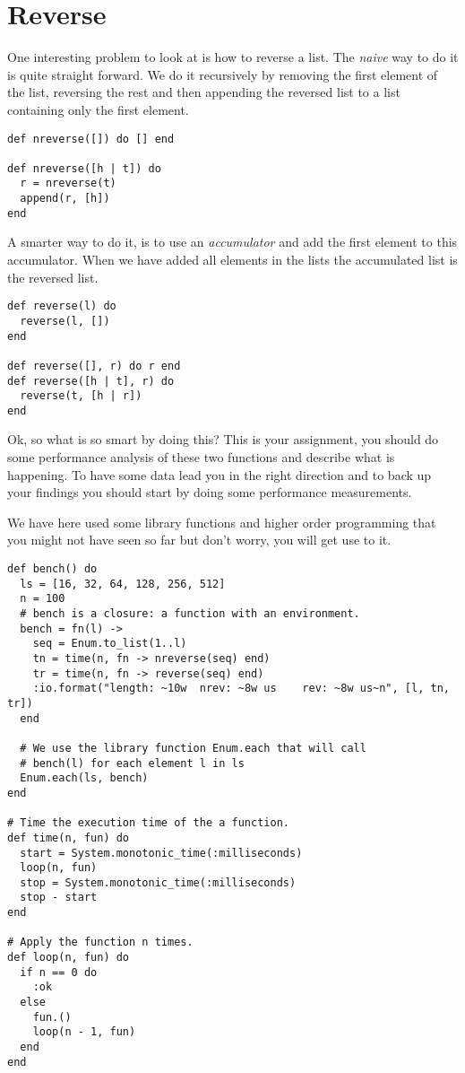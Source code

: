 \documentclass[a4paper,11pt]{article}
\begin{document}
\section{Reverse}

One interesting problem to look at is how to reverse a list. The {\em
  naive} way to do it is quite straight forward. We do it recursively
by removing the first element of the list, reversing the rest and then
appending the reversed list to a list containing only the first element.

\begin{verbatim}
def nreverse([]) do [] end

def nreverse([h | t]) do
  r = nreverse(t)
  append(r, [h])
end
\end{verbatim}

A smarter way to do it, is to use an {\em accumulator} and add the
first element to this accumulator. When we have added all elements in
the lists the accumulated list is the reversed list.

\begin{verbatim}
def reverse(l) do
  reverse(l, [])
end

def reverse([], r) do r end
def reverse([h | t], r) do
  reverse(t, [h | r])
end
\end{verbatim}

Ok, so what is so smart by doing this? This is your assignment, you
should do some performance analysis of these two functions and
describe what is happening. To have some data lead you in the right
direction and to back up your findings you should start by doing some
performance measurements.

We have here used some library functions and higher order programming
that you might not have seen so far but don't worry, you will get use
to it.

\begin{verbatim}
def bench() do
  ls = [16, 32, 64, 128, 256, 512]
  n = 100
  # bench is a closure: a function with an environment.
  bench = fn(l) ->
    seq = Enum.to_list(1..l)
    tn = time(n, fn -> nreverse(seq) end)
    tr = time(n, fn -> reverse(seq) end)
    :io.format("length: ~10w  nrev: ~8w us    rev: ~8w us~n", [l, tn, tr])
  end

  # We use the library function Enum.each that will call
  # bench(l) for each element l in ls
  Enum.each(ls, bench)
end

# Time the execution time of the a function.
def time(n, fun) do
  start = System.monotonic_time(:milliseconds)
  loop(n, fun)
  stop = System.monotonic_time(:milliseconds)
  stop - start
end

# Apply the function n times.
def loop(n, fun) do
  if n == 0 do
    :ok
  else
    fun.()
    loop(n - 1, fun)
  end
end
\end{verbatim}
\end{document}
